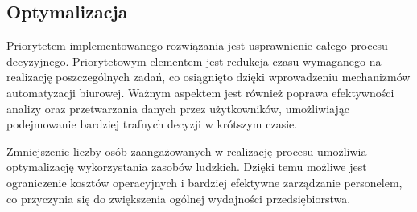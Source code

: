 \subsection{Optymalizacja}
Priorytetem implementowanego rozwiązania jest usprawnienie całego procesu decyzyjnego. Priorytetowym elementem jest redukcja czasu wymaganego na realizację poszczególnych zadań, co osiągnięto dzięki wprowadzeniu mechanizmów automatyzacji biurowej. Ważnym aspektem jest również poprawa efektywności analizy oraz przetwarzania danych przez użytkowników, umożliwiając podejmowanie bardziej trafnych decyzji w krótszym czasie.

Zmniejszenie liczby osób zaangażowanych w realizację procesu umożliwia optymalizację wykorzystania zasobów ludzkich. Dzięki temu możliwe jest ograniczenie kosztów operacyjnych i bardziej efektywne zarządzanie personelem, co przyczynia się do zwiększenia ogólnej wydajności przedsiębiorstwa.